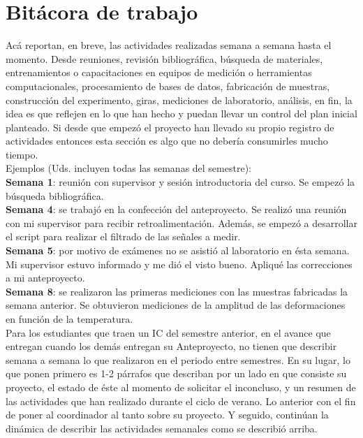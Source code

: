 \section{Bitácora de trabajo}

Acá reportan, en breve, las actividades realizadas semana a semana hasta el momento. Desde reuniones, revisión bibliográfica, búsqueda de materiales, entrenamientos o capacitaciones en equipos de medición o herramientas computacionales, procesamiento de bases de datos, fabricación de muestras, construcción del experimento, giras, mediciones de laboratorio, análisis, en fin, la idea es que reflejen en lo que han hecho y puedan llevar un control del plan inicial planteado. Si desde que empezó el proyecto han llevado su propio registro de actividades entonces esta sección es algo que no debería consumirles mucho tiempo.\\

Ejemplos (Uds. incluyen todas las semanas del semestre): \\

\textbf{Semana 1}: reunión con supervisor y sesión introductoria del curso. Se empezó la búsqueda bibliográfica.\\

\textbf{Semana 4}: se trabajó en la confección del anteproyecto. Se realizó una reunión con mi supervisor para recibir retroalimentación. Además, se empezó a desarrollar el script para realizar el filtrado de las señales a medir.\\ 

\textbf{Semana 5}: por motivo de exámenes no se asistió al laboratorio en ésta semana. Mi supervisor estuvo informado y me dió el visto bueno. Apliqué las correcciones a mi anteproyecto. \\

\textbf{Semana 8}: se realizaron las primeras mediciones con las muestras fabricadas la semana anterior. Se obtuvieron mediciones de la amplitud de las deformaciones en función de la temperatura. \\

Para los estudiantes que traen un IC del semestre anterior, en el avance que entregan cuando los demás entregan su Anteproyecto, no tienen que describir semana a semana lo que realizaron en el periodo entre semestres. En su lugar, lo que ponen primero es 1-2 párrafos que describan por un lado en que consiste su proyecto, el estado de éste al momento de solicitar el inconcluso, y un resumen de las actividades que han realizado durante el ciclo de verano. Lo anterior con el fin de poner al coordinador al tanto sobre su proyecto. Y seguido, continúan la dinámica de describir las actividades semanales como se describió arriba.

